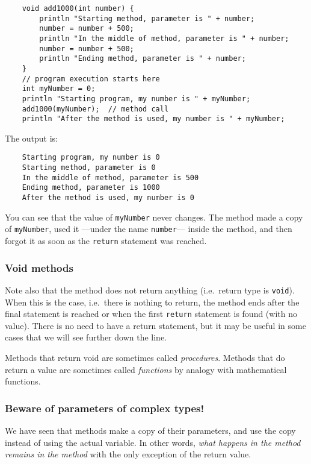 \begin{verbatim}
    void add1000(int number) {
        println "Starting method, parameter is " + number;
        number = number + 500;
        println "In the middle of method, parameter is " + number;
        number = number + 500;
        println "Ending method, parameter is " + number;
    }
    // program execution starts here
    int myNumber = 0;
    println "Starting program, my number is " + myNumber;
    add1000(myNumber);  // method call
    println "After the method is used, my number is " + myNumber;
\end{verbatim}

The output is: 

\begin{verbatim}
    Starting program, my number is 0
    Starting method, parameter is 0
    In the middle of method, parameter is 500
    Ending method, parameter is 1000
    After the method is used, my number is 0
\end{verbatim}

You can see that the value of \verb+myNumber+ never changes. The
method made a copy of \verb+myNumber+, used it ---under the name
\verb+number+--- inside the method, and then forgot it as soon as the
\verb+return+ statement was reached. 

\subsubsection*{Void methods}
\label{void}

Note also that the method does not return anything (i.e.~return type
is \verb+void+). When this is the case, 
i.e.~there is nothing to return, the method
ends after the final statement is reached or when the first \verb+return+
statement is found (with no value). There is no need to have a return
statement, but it may be useful in some cases that we will see further
down the line. 

Methods that return void are sometimes called
\emph{procedures}. Methods that do return a value are sometimes called
\emph{functions} by analogy with mathematical functions.

\subsubsection{Beware of parameters of complex types!}
\label{beware}

We have seen that methods make a copy of their
parameters, and use the copy instead of using the actual variable. In
other words, \emph{what happens in the method remains in the method}
with the only exception of the return value. 


